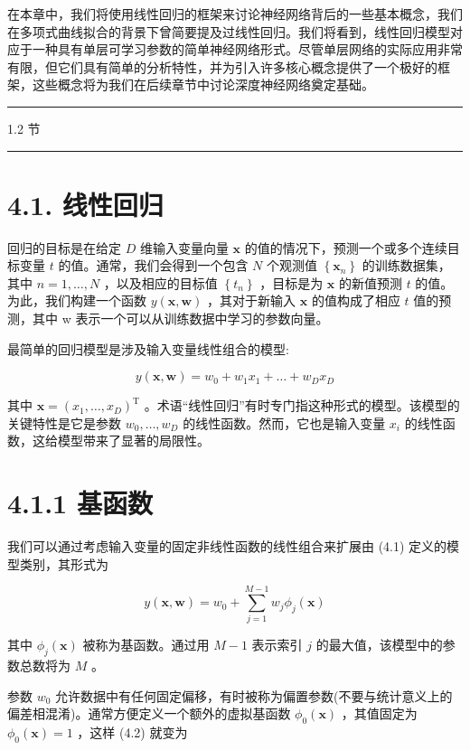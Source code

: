 \documentclass[10pt]{article}
\newcommand{\HRule}{\begin{center}\rule{0.9\linewidth}{0.2mm}\end{center}}
\begin{document}
在本章中，我们将使用线性回归的框架来讨论神经网络背后的一些基本概念，我们在多项式曲线拟合的背景下曾简要提及过线性回归。我们将看到，线性回归模型对应于一种具有单层可学习参数的简单神经网络形式。尽管单层网络的实际应用非常有限，但它们具有简单的分析特性，并为引入许多核心概念提供了一个极好的框架，这些概念将为我们在后续章节中讨论深度神经网络奠定基础。

\HRule

1.2 节

\HRule

\section*{4.1. 线性回归}

回归的目标是在给定 \(D\) 维输入变量向量 \(\mathbf{x}\) 的值的情况下，预测一个或多个连续目标变量 \(t\) 的值。通常，我们会得到一个包含 \(N\) 个观测值 \(\left\{  {\mathbf{x}}_{n}\right\}\) 的训练数据集，其中 \(n = 1,\ldots ,N\) ，以及相应的目标值 \(\left\{  {t}_{n}\right\}\) ，目标是为 \(\mathbf{x}\) 的新值预测 \(t\) 的值。为此，我们构建一个函数 \(y\left( {\mathbf{x},\mathbf{w}}\right)\) ，其对于新输入 \(\mathbf{x}\) 的值构成了相应 \(t\) 值的预测，其中 w 表示一个可以从训练数据中学习的参数向量。

最简单的回归模型是涉及输入变量线性组合的模型:

\[
y\left( {\mathbf{x},\mathbf{w}}\right)  = {w}_{0} + {w}_{1}{x}_{1} + \ldots  + {w}_{D}{x}_{D} \tag{4.1}
\]

其中 \(\mathbf{x} = {\left( {x}_{1},\ldots ,{x}_{D}\right) }^{\mathrm{T}}\) 。术语“线性回归”有时专门指这种形式的模型。该模型的关键特性是它是参数 \({w}_{0},\ldots ,{w}_{D}\) 的线性函数。然而，它也是输入变量 \({x}_{i}\) 的线性函数，这给模型带来了显著的局限性。

\section*{4.1.1 基函数}

我们可以通过考虑输入变量的固定非线性函数的线性组合来扩展由 (4.1) 定义的模型类别，其形式为

\[
y\left( {\mathbf{x},\mathbf{w}}\right)  = {w}_{0} + \mathop{\sum }\limits_{{j = 1}}^{{M - 1}}{w}_{j}{\phi }_{j}\left( \mathbf{x}\right)  \tag{4.2}
\]

其中 \({\phi }_{j}\left( \mathbf{x}\right)\) 被称为基函数。通过用 \(M - 1\) 表示索引 \(j\) 的最大值，该模型中的参数总数将为 \(M\) 。

参数 \({w}_{0}\) 允许数据中有任何固定偏移，有时被称为偏置参数(不要与统计意义上的偏差相混淆)。通常方便定义一个额外的虚拟基函数 \({\phi }_{0}\left( \mathbf{x}\right)\) ，其值固定为 \({\phi }_{0}\left( \mathbf{x}\right)  = 1\) ，这样 (4.2) 就变为
\end{document}
